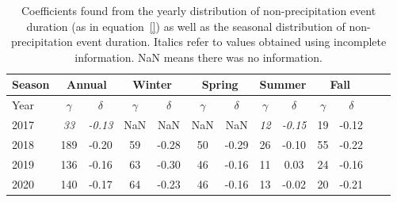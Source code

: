 \begin{table}[htb]
  \begin{center}
    \begin{tabular}{|l|*{11}{c|}r|}
      \hline
      Season    &       \multicolumn{2}{|c|}{Annual}          & \multicolumn{2}{|c|}{Winter}& \multicolumn{2}{|c|}{Spring}  & \multicolumn{2}{|c|}{Summer} &\multicolumn{2}{|c|}{Fall}  \\
      \hline
      Year      & $\gamma $ & $\delta$  & $\gamma $ & $\delta$ & $\gamma $ & $\delta$ & $\gamma $ & $\delta$ & $\gamma $ & $\delta$\\
      \hline
      2017      & \textit{33}  & \textit{-0.13}  & NaN & NaN & NaN & NaN & \textit{12}  & \textit{-0.15}  & 19  & -0.12  \\
      2018      & 189           & -0.20  & 59 & -0.28 & 50 & -0.29 & 26  & -0.10  & 55 & -0.22  \\
      2019      & 136           & -0.16  & 63 & -0.30 & 46 & -0.16 & 11 & 0.03 & 24 & -0.16   \\
      2020      & 140           & -0.17  & 64 & -0.23 & 46 & -0.16 & 13  & -0.02  & 20 & -0.21 \\
      \hline
    \end{tabular}
  \end{center}
  \caption[Year comparison of coefficients for non-precipitation
    events] {\label{thirdtable}Coefficients found from the yearly
    distribution of non-precipitation event duration (as in
    equation~\ref{}) as well as the seasonal distribution of
    non-precipitation event duration. Italics refer to values obtained
    using incomplete information. NaN means there was no
    information. }
\end{table}
